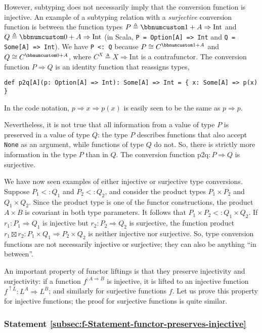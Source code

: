 However, subtyping does not necessarily imply that the conversion
function is injective. An example of a subtyping relation with a \emph{surjective}
conversion function is between the function types $P\triangleq\bbnum 1+A\Rightarrow\text{Int}$
and $Q\triangleq\bbnum 0+A\Rightarrow\text{Int}$ (in Scala, \lstinline!P = Option[A] => Int!
and \lstinline!Q = Some[A] => Int!). We have \lstinline!P <: Q!
because $P\cong C^{\bbnum 1+A}$ and $Q\cong C^{\bbnum 0+A}$, where
$C^{X}\triangleq X\Rightarrow\text{Int}$ is a contrafunctor. The
conversion function $P\Rightarrow Q$ is an identity function that
reassigns types,
\begin{lstlisting}
def p2q[A](p: Option[A] => Int): Some[A] => Int = { x: Some[A] => p(x) }
\end{lstlisting}
In the code notation, $p\Rightarrow x\Rightarrow p(x)$ is easily
seen to be the same as $p\Rightarrow p$. 

Nevertheless, it is not true that all information from a value of
type $P$ is preserved in a value of type $Q$: the type $P$ describes
functions that also accept \lstinline!None! as an argument, while
functions of type $Q$ do not. So, there is strictly more information
in the type $P$ than in $Q$. The conversion function $\text{p2q}:P\Rightarrow Q$
is surjective.

We have now seen examples of either injective or surjective type conversions.
Suppose $P_{1}<:Q_{1}$ and $P_{2}<:Q_{2}$, and consider the product
types $P_{1}\times P_{2}$ and $Q_{1}\times Q_{2}$. Since the product
type is one of the functor constructions, the product $A\times B$
is covariant in both type parameters. It follows that $P_{1}\times P_{2}<:Q_{1}\times Q_{2}$.
If $r_{1}:P_{1}\Rightarrow Q_{1}$ is injective but $r_{2}:P_{2}\Rightarrow Q_{2}$
is surjective, the function product $r_{1}\boxtimes r_{2}:P_{1}\times Q_{1}\Rightarrow P_{2}\times Q_{2}$
is neither injective nor surjective. So, type conversion functions
are not necessarily injective or surjective; they can also be anything
``in between''.

An important property of functor liftings is that they preserve injectivity
and surjectivity: if a function $f^{:A\Rightarrow B}$ is injective,
it is lifted to an injective function $f^{\uparrow L}:L^{A}\Rightarrow L^{B}$;
and similarly for surjective functions $f$. Let us prove this property
for injective functions; the proof for surjective functions is quite
similar.

\subsubsection{Statement \label{subsec:f-Statement-functor-preserves-injective}\ref{subsec:f-Statement-functor-preserves-injective}}

